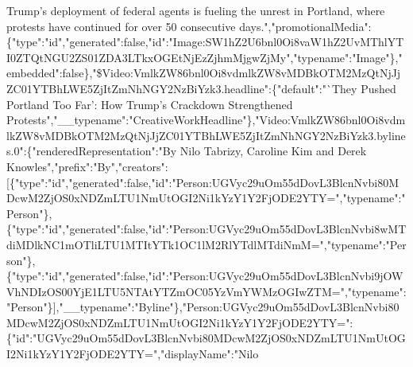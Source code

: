 Trump's deployment of federal agents is fueling the unrest in Portland,
where protests have continued for over 50 consecutive
days.","promotionalMedia":\{"type":"id","generated":false,"id":"Image:SW1hZ2U6bnl0Oi8vaW1hZ2UvMThlYTI0ZTQtNGU2ZS01ZDA3LTkxOGEtNjEzZjhmMjgwZjMy","typename":"Image"\},"embedded":false\},"\$Video:VmlkZW86bnl0Oi8vdmlkZW8vMDBkOTM2MzQtNjJjZC01YTBhLWE5ZjItZmNhNGY2NzBiYzk3.headline":\{"default":"`They
Pushed Portland Too Far': How Trump's Crackdown Strengthened
Protests","\_\_typename":"CreativeWorkHeadline"\},"Video:VmlkZW86bnl0Oi8vdmlkZW8vMDBkOTM2MzQtNjJjZC01YTBhLWE5ZjItZmNhNGY2NzBiYzk3.bylines.0":\{"renderedRepresentation":"By
Nilo Tabrizy, Caroline Kim and Derek
Knowles","prefix":"By","creators":{[}\{"type":"id","generated":false,"id":"Person:UGVyc29uOm55dDovL3BlcnNvbi80MDcwM2ZjOS0xNDZmLTU1NmUtOGI2Ni1kYzY1Y2FjODE2YTY=","typename":"Person"\},\{"type":"id","generated":false,"id":"Person:UGVyc29uOm55dDovL3BlcnNvbi8wMTdiMDlkNC1mOTliLTU1MTItYTk1OC1lM2RlYTdlMTdiNmM=","typename":"Person"\},\{"type":"id","generated":false,"id":"Person:UGVyc29uOm55dDovL3BlcnNvbi9jOWVhNDIzOS00YjE1LTU5NTAtYTZmOC05YzVmYWMzOGIwZTM=","typename":"Person"\}{]},"\_\_typename":"Byline"\},"Person:UGVyc29uOm55dDovL3BlcnNvbi80MDcwM2ZjOS0xNDZmLTU1NmUtOGI2Ni1kYzY1Y2FjODE2YTY=":\{"id":"UGVyc29uOm55dDovL3BlcnNvbi80MDcwM2ZjOS0xNDZmLTU1NmUtOGI2Ni1kYzY1Y2FjODE2YTY=","displayName":"Nilo
